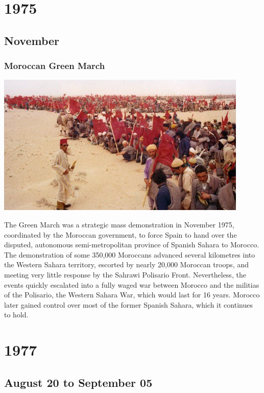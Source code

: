 \documentclass[11pt]{report}
\begin{document}
\chapter{1975}
\section{November}
\subsection{Moroccan Green March}
\vspace{2mm}\begin{center}\includegraphics[width=12cm]{./img/greenmarch.jpg}\end{center}
The Green March was a strategic mass demonstration in November 1975, coordinated by the Moroccan government, to force Spain to hand over the disputed, autonomous semi-metropolitan province of Spanish Sahara to Morocco. The demonstration of some 350,000 Moroccans advanced several kilometres into the Western Sahara territory, escorted by nearly 20,000 Moroccan troops, and meeting very little response by the Sahrawi Polisario Front. Nevertheless, the events quickly escalated into a fully waged war between Morocco and the militias of the Polisario, the Western Sahara War, which would last for 16 years. Morocco later gained control over most of the former Spanish Sahara, which it continues to hold.

\chapter{1977}
\section{August 20 to September 05}
\end{document}
